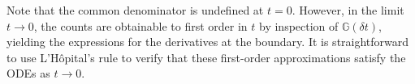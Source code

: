 \documentclass{article}
\begin{document}
Note that the common denominator is undefined at $t=0$.
However, in the limit $t \to 0$, the counts are obtainable to first order in $t$ by inspection of $\mathbb{G}(\delta t)$,
yielding the expressions for the derivatives at the boundary.
It is straightforward to use L'H\^{o}pital's rule to verify that these first-order approximations satisfy the ODEs as $t \to 0$.
%

\end{document}
